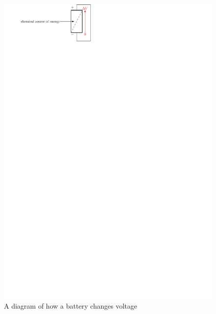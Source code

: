 \documentclass{article}
\begin{document}
\begin{itemize}
\begin{figure}[H]
          \includegraphics{figures/battery.pdf}
          \caption{A diagram of how a battery changes voltage}
        \end{figure}
        \begin{figure}[H]
          \centering

\end{figure}
\end{itemize}
\end{document}
